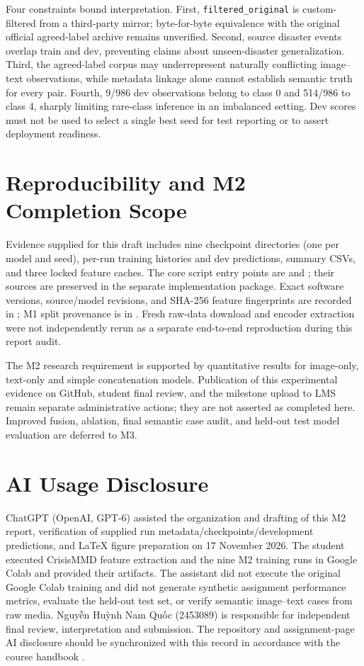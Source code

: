 \documentclass[11pt,a4paper]{article}
\newcommand{\primary}{\texttt{filtered\_original}}
\begin{document}
Four constraints bound interpretation. First, \primary{} is custom-filtered from a third-party mirror; byte-for-byte equivalence with the original official agreed-label archive remains unverified. Second, source disaster events overlap train and dev, preventing claims about unseen-disaster generalization. Third, the agreed-label corpus may underrepresent naturally conflicting image--text observations, while metadata linkage alone cannot establish semantic truth for every pair. Fourth, 9/986 dev observations belong to class 0 and 514/986 to class 4, sharply limiting rare-class inference in an imbalanced setting. Dev scores must not be used to select a single best seed for test reporting or to assert deployment readiness.

\section{Reproducibility and M2 Completion Scope}
Evidence supplied for this draft includes nine checkpoint directories (one per model and seed), per-run training histories and dev predictions, summary CSVs, and three locked feature caches. The core script entry points are  and ; their sources are preserved in the separate implementation package. Exact software versions, source/model revisions, and SHA-256 feature fingerprints are recorded in ; M1 split provenance is in . Fresh raw-data download and encoder extraction were not independently rerun as a separate end-to-end reproduction during this report audit.

The M2 research requirement is supported by quantitative results for image-only, text-only and simple concatenation models. Publication of this experimental evidence on GitHub, student final review, and the milestone upload to LMS remain separate administrative actions; they are not asserted as completed here. Improved fusion, ablation, final semantic case audit, and held-out test model evaluation are deferred to M3.

\section{AI Usage Disclosure}
ChatGPT (OpenAI, GPT-6) assisted the organization and drafting of this M2 report, verification of supplied run metadata/checkpoints/development predictions, and LaTeX figure preparation on 17 November 2026. The student executed CrisisMMD feature extraction and the nine M2 training runs in Google Colab and provided their artifacts. The assistant did not execute the original Google Colab training and did not generate synthetic assignment performance metrics, evaluate the held-out test set, or verify semantic image--text cases from raw media. Nguyễn Huỳnh Nam Quốc (2453089) is responsible for independent final review, interpretation and submission. The repository and assignment-page AI disclosure should be synchronized with this record in accordance with the course handbook \cite{handbook2026}.
\end{document}
